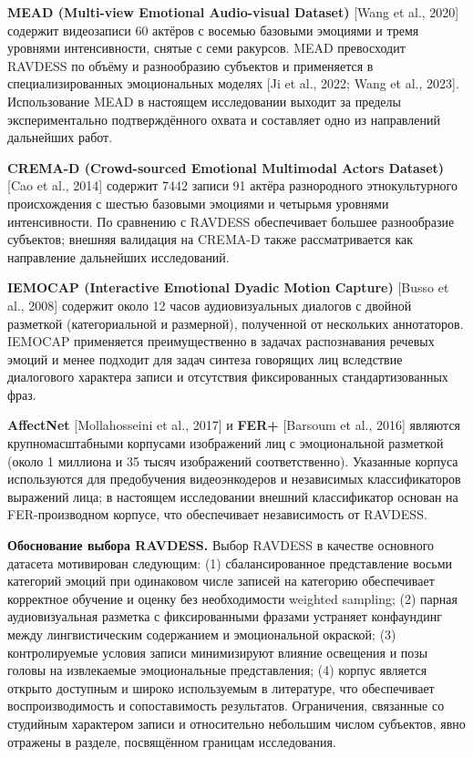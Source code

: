 \documentclass[a4paper, 12pt, oneside, openany]{article}
\begin{document}
\textbf{MEAD (Multi-view Emotional Audio-visual Dataset)} [Wang et al., 2020] содержит видеозаписи 60 актёров с восемью базовыми эмоциями и тремя уровнями интенсивности, снятые с семи ракурсов. MEAD превосходит RAVDESS по объёму и разнообразию субъектов и применяется в специализированных эмоциональных моделях [Ji et al., 2022; Wang et al., 2023]. Использование MEAD в настоящем исследовании выходит за пределы экспериментально подтверждённого охвата и составляет одно из направлений дальнейших работ.

\textbf{CREMA-D (Crowd-sourced Emotional Multimodal Actors Dataset)} [Cao et al., 2014] содержит 7442 записи 91 актёра разнородного этнокультурного происхождения с шестью базовыми эмоциями и четырьмя уровнями интенсивности. По сравнению с RAVDESS обеспечивает большее разнообразие субъектов; внешняя валидация на CREMA-D также рассматривается как направление дальнейших исследований.

\textbf{IEMOCAP (Interactive Emotional Dyadic Motion Capture)} [Busso et al., 2008] содержит около 12 часов аудиовизуальных диалогов с двойной разметкой (категориальной и размерной), полученной от нескольких аннотаторов. IEMOCAP применяется преимущественно в задачах распознавания речевых эмоций и менее подходит для задач синтеза говорящих лиц вследствие диалогового характера записи и отсутствия фиксированных стандартизованных фраз.

\textbf{AffectNet} [Mollahosseini et al., 2017] и \textbf{FER+} [Barsoum et al., 2016] являются крупномасштабными корпусами изображений лиц с эмоциональной разметкой (около 1 миллиона и 35 тысяч изображений соответственно). Указанные корпуса используются для предобучения видеоэнкодеров и независимых классификаторов выражений лица; в настоящем исследовании внешний классификатор основан на FER-производном корпусе, что обеспечивает независимость от RAVDESS.

\textbf{Обоснование выбора RAVDESS.} Выбор RAVDESS в качестве основного датасета мотивирован следующим: (1) сбалансированное представление восьми категорий эмоций при одинаковом числе записей на категорию обеспечивает корректное обучение и оценку без необходимости weighted sampling; (2) парная аудиовизуальная разметка с фиксированными фразами устраняет конфаундинг между лингвистическим содержанием и эмоциональной окраской; (3) контролируемые условия записи минимизируют влияние освещения и позы головы на извлекаемые эмоциональные представления; (4) корпус является открыто доступным и широко используемым в литературе, что обеспечивает воспроизводимость и сопоставимость результатов. Ограничения, связанные со студийным характером записи и относительно небольшим числом субъектов, явно отражены в разделе, посвящённом границам исследования.
\end{document}
